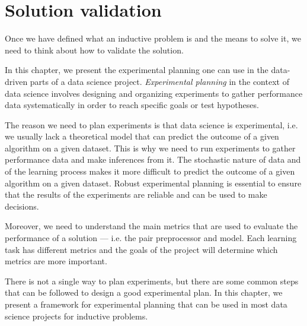 \chapter{Solution validation}
\label{chap:planning}
\glsresetall


Once we have defined what an inductive problem is and the means to solve it, we need to
think about how to validate the solution.

In this chapter, we present the experimental planning one can use in the data-driven
parts of a data science project.  \emph{Experimental planning}  in the context of data
science involves designing and organizing experiments to gather performance data
systematically in order to reach specific goals or test hypotheses.

The reason we need to plan experiments is that data science is experimental, i.e. we
usually lack a theoretical model that can predict the outcome of a given algorithm on a
given dataset.  This is why we need to run experiments to gather performance data and make
inferences from it.  The stochastic nature of data and of the learning process makes it
more difficult to predict the outcome of a given algorithm on a given dataset.  Robust
experimental planning is essential to ensure that the results of the experiments are
reliable and can be used to make decisions.

Moreover, we need to understand the main metrics that are used to evaluate the performance
of a solution --- i.e. the pair preprocessor and model.  Each learning task has different
metrics and the goals of the project will determine which metrics are more important.

There is not a single way to plan experiments, but there are some common steps that can
be followed to design a good experimental plan.  In this chapter, we present a
framework for experimental planning that can be used in most data science projects
for inductive problems.

